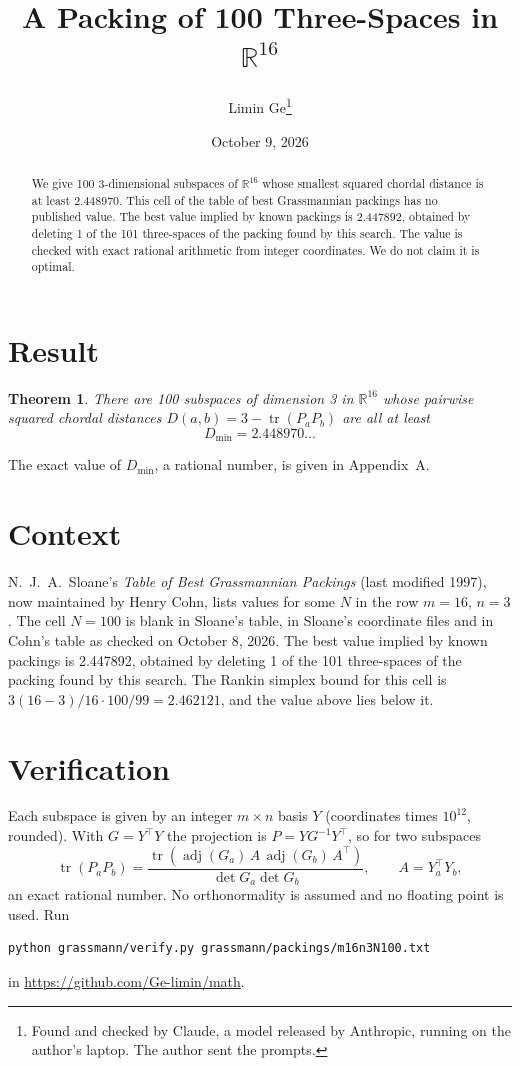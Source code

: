 \documentclass[11pt,a4paper]{article}
\title{A Packing of 100 Three-Spaces in $\mathbb{R}^{16}$}
\author{Limin Ge\thanks{Found and checked by Claude, a model released by Anthropic, running on the author's laptop. The author sent the prompts.}}
\date{October 9, 2026}
\newtheorem*{theorem}{Theorem}
\begin{document}
\maketitle
\begin{abstract}
We give 100 3-dimensional subspaces of $\mathbb{R}^{16}$ whose smallest squared chordal distance is at least 2.448970. This cell of the table of best Grassmannian packings has no published value. The best value implied by known packings is 2.447892, obtained by deleting 1 of the 101 three-spaces of the packing found by this search. The value is checked with exact rational arithmetic from integer coordinates. We do not claim it is optimal.
\end{abstract}

\section{Result}
\begin{theorem}
There are 100 subspaces of dimension 3 in $\mathbb{R}^{16}$ whose pairwise squared chordal distances $D(a,b) = 3 - \operatorname{tr}(P_aP_b)$ are all at least
\[ D_{\min} = 2.448970\ldots \]
\end{theorem}
The exact value of $D_{\min}$, a rational number, is given in Appendix~A.


\section{Context}
N.~J.~A.~Sloane's \emph{Table of Best Grassmannian Packings} (last modified 1997), now maintained by Henry Cohn, lists values for some $N$ in the row $m=16$, $n=3$. The cell $N=100$ is blank in Sloane's table, in Sloane's coordinate files and in Cohn's table as checked on October 8, 2026. The best value implied by known packings is 2.447892, obtained by deleting 1 of the 101 three-spaces of the packing found by this search. The Rankin simplex bound for this cell is $3(16-3)/16\cdot 100/99 = 2.462121$, and the value above lies below it.


\section{Verification}
Each subspace is given by an integer $m\times n$ basis $Y$ (coordinates times $10^{12}$, rounded). With $G=Y^\top Y$ the projection is $P=YG^{-1}Y^\top$, so for two subspaces
\[ \operatorname{tr}(P_aP_b)=\frac{\operatorname{tr}(\operatorname{adj}(G_a)\,A\,\operatorname{adj}(G_b)\,A^\top)}{\det G_a\det G_b},\qquad A=Y_a^\top Y_b, \]
an exact rational number. No orthonormality is assumed and no floating point is used. Run
\begin{verbatim}
python grassmann/verify.py grassmann/packings/m16n3N100.txt
\end{verbatim}
in \url{https://github.com/Ge-limin/math}.
\end{document}
